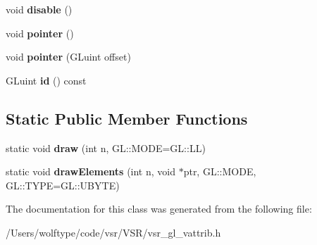 \begin{DoxyCompactItemize}
\item 
\hypertarget{classvsr_1_1_v_attrib_a5bc456975a0dcc4b621d3dee33ac41c7}{void {\bfseries disable} ()}\label{classvsr_1_1_v_attrib_a5bc456975a0dcc4b621d3dee33ac41c7}

\item 
\hypertarget{classvsr_1_1_v_attrib_a7f469e36099b3e2a0407730866c4a5d7}{void {\bfseries pointer} ()}\label{classvsr_1_1_v_attrib_a7f469e36099b3e2a0407730866c4a5d7}

\item 
\hypertarget{classvsr_1_1_v_attrib_aa6542b415af23d16d139b2528c8e836f}{void {\bfseries pointer} (G\-Luint offset)}\label{classvsr_1_1_v_attrib_aa6542b415af23d16d139b2528c8e836f}

\item 
\hypertarget{classvsr_1_1_v_attrib_ad3e994a67dc893fb9c109770697fdd80}{G\-Luint {\bfseries id} () const }\label{classvsr_1_1_v_attrib_ad3e994a67dc893fb9c109770697fdd80}

\end{DoxyCompactItemize}
\subsection*{Static Public Member Functions}
\begin{DoxyCompactItemize}
\item 
\hypertarget{classvsr_1_1_v_attrib_a8f1e39ca36ab73af23ba87cc0b21f5f3}{static void {\bfseries draw} (int n, G\-L\-::\-M\-O\-D\-E=G\-L\-::\-L\-L)}\label{classvsr_1_1_v_attrib_a8f1e39ca36ab73af23ba87cc0b21f5f3}

\item 
\hypertarget{classvsr_1_1_v_attrib_abdba5f1b2553001498dddda130406e99}{static void {\bfseries draw\-Elements} (int n, void $\ast$ptr, G\-L\-::\-M\-O\-D\-E, G\-L\-::\-T\-Y\-P\-E=G\-L\-::\-U\-B\-Y\-T\-E)}\label{classvsr_1_1_v_attrib_abdba5f1b2553001498dddda130406e99}

\end{DoxyCompactItemize}


The documentation for this class was generated from the following file\-:\begin{DoxyCompactItemize}
\item 
/\-Users/wolftype/code/vsr/\-V\-S\-R/vsr\-\_\-gl\-\_\-vattrib.\-h\end{DoxyCompactItemize}
